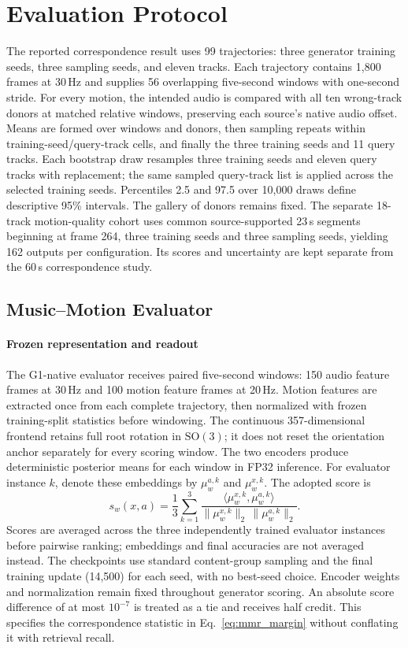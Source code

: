 \section{Evaluation Protocol}
\label{app:scope}
The reported correspondence result uses 99 trajectories:
three generator training seeds, three sampling seeds, and eleven tracks.
Each trajectory contains 1,800 frames at 30\,Hz and supplies 56 overlapping
five-second windows with one-second stride. For every motion, the intended audio is compared with all ten wrong-track
donors at matched relative windows, preserving each source's native audio
offset. Means are formed over windows and donors, then sampling repeats within
training-seed/query-track cells, and finally the three training seeds and
11 query tracks. Each bootstrap draw resamples three training seeds and eleven
query tracks with replacement; the same sampled query-track list is applied
across the selected training seeds. Percentiles 2.5 and 97.5 over 10,000 draws
define descriptive 95\% intervals. The gallery of donors remains fixed.
The separate 18-track motion-quality cohort uses common source-supported 23\,s
segments beginning at frame 264, three training seeds and three sampling seeds,
yielding 162 outputs per configuration. Its scores and uncertainty are kept
separate from the 60\,s correspondence study.

\subsection{Music--Motion Evaluator}
\label{app:metric_construction}
\paragraph{Frozen representation and readout}
The G1-native evaluator receives paired five-second windows: 150 audio feature
frames at 30\,Hz and 100 motion feature frames at 20\,Hz. Motion features are
extracted once from each complete trajectory, then normalized with frozen
training-split statistics before windowing. The continuous 357-dimensional
frontend retains full root rotation in $\mathrm{SO}(3)$; it does not reset the
orientation anchor separately for every scoring window. The two encoders
produce deterministic posterior means for each window in FP32 inference.
For evaluator instance $k$, denote these embeddings by
$\mu^{a,k}_w$ and $\mu^{x,k}_w$. The adopted score is
\begin{equation}
 s_w(x,a)=\frac{1}{3}\sum_{k=1}^{3}
 \frac{\langle\mu^{x,k}_w,\mu^{a,k}_w\rangle}
 {\|\mu^{x,k}_w\|_2\,\|\mu^{a,k}_w\|_2}.
 \label{eq:mmr_cosine_score}
\end{equation}
Scores are averaged across the three independently trained evaluator instances
before pairwise ranking; embeddings and final accuracies are not averaged
instead. The checkpoints use standard content-group sampling and the final
training update (14,500) for each seed, with no best-seed choice. Encoder weights and
normalization remain fixed throughout generator scoring.
An absolute score difference of at most $10^{-7}$ is treated as a tie and
receives half credit. This specifies the correspondence statistic in
Eq.~\eqref{eq:mmr_margin} without conflating it with retrieval recall.

